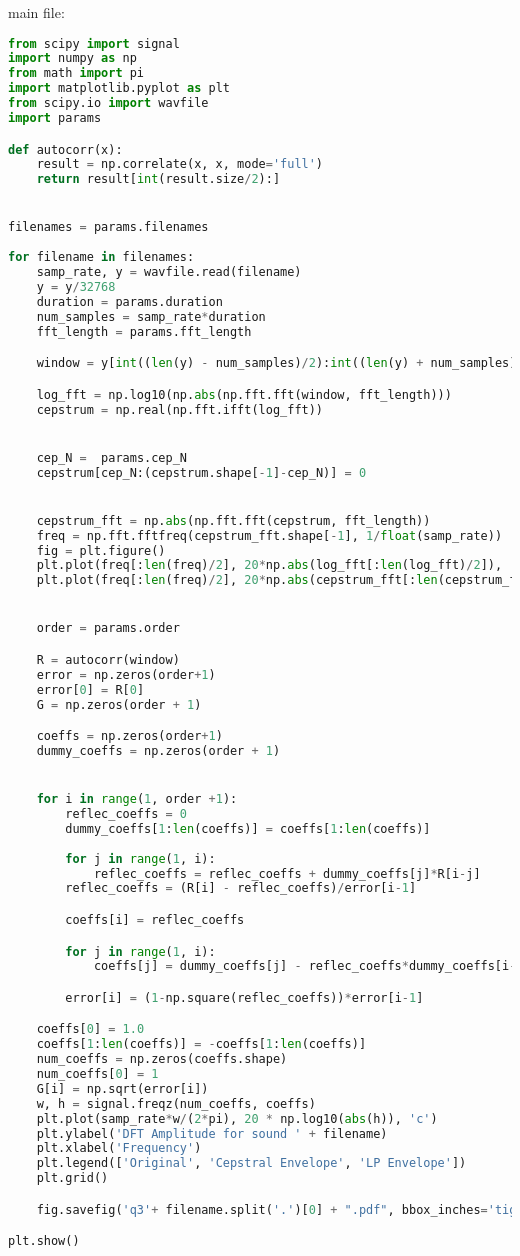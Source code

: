 \documentclass[a4paper]{article}
\begin{document}
main file: 
\begin{lstlisting}[language=Python, caption=q2.py]
from scipy import signal
import numpy as np
from math import pi
import matplotlib.pyplot as plt
from scipy.io import wavfile
import params

def autocorr(x):
    result = np.correlate(x, x, mode='full')
    return result[int(result.size/2):]


filenames = params.filenames
    
for filename in filenames:
    samp_rate, y = wavfile.read(filename)
    y = y/32768
    duration = params.duration
    num_samples = samp_rate*duration 
    fft_length = params.fft_length

    window = y[int((len(y) - num_samples)/2):int((len(y) + num_samples)/2)]*np.hamming(num_samples)

    log_fft = np.log10(np.abs(np.fft.fft(window, fft_length)))
    cepstrum = np.real(np.fft.ifft(log_fft))


    cep_N =  params.cep_N
    cepstrum[cep_N:(cepstrum.shape[-1]-cep_N)] = 0


    cepstrum_fft = np.abs(np.fft.fft(cepstrum, fft_length))
    freq = np.fft.fftfreq(cepstrum_fft.shape[-1], 1/float(samp_rate))
    fig = plt.figure()
    plt.plot(freq[:len(freq)/2], 20*np.abs(log_fft[:len(log_fft)/2]), 'r')
    plt.plot(freq[:len(freq)/2], 20*np.abs(cepstrum_fft[:len(cepstrum_fft)/2]), 'b')


    order = params.order 

    R = autocorr(window)
    error = np.zeros(order+1)
    error[0] = R[0]
    G = np.zeros(order + 1)

    coeffs = np.zeros(order+1)
    dummy_coeffs = np.zeros(order + 1)


    for i in range(1, order +1):
        reflec_coeffs = 0
        dummy_coeffs[1:len(coeffs)] = coeffs[1:len(coeffs)]
        
        for j in range(1, i):
            reflec_coeffs = reflec_coeffs + dummy_coeffs[j]*R[i-j]
        reflec_coeffs = (R[i] - reflec_coeffs)/error[i-1]

        coeffs[i] = reflec_coeffs

        for j in range(1, i):
            coeffs[j] = dummy_coeffs[j] - reflec_coeffs*dummy_coeffs[i-j]

        error[i] = (1-np.square(reflec_coeffs))*error[i-1]

    coeffs[0] = 1.0
    coeffs[1:len(coeffs)] = -coeffs[1:len(coeffs)]
    num_coeffs = np.zeros(coeffs.shape)
    num_coeffs[0] = 1
    G[i] = np.sqrt(error[i])
    w, h = signal.freqz(num_coeffs, coeffs)
    plt.plot(samp_rate*w/(2*pi), 20 * np.log10(abs(h)), 'c')
    plt.ylabel('DFT Amplitude for sound ' + filename)
    plt.xlabel('Frequency')
    plt.legend(['Original', 'Cepstral Envelope', 'LP Envelope'])
    plt.grid()

    fig.savefig('q3'+ filename.split('.')[0] + ".pdf", bbox_inches='tight')

plt.show()    
\end{lstlisting}
\end{document}

